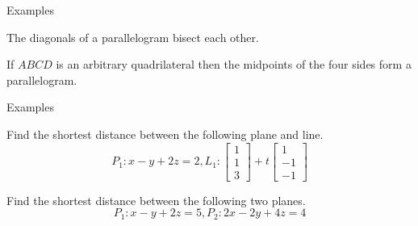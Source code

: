 \documentclass{beamer}
\begin{document}
\begin{frame}{Examples}
    \begin{example}
        The diagonals of a parallelogram bisect each other.
      \end{example}
      \begin{example}
        If $ABCD$ is an arbitrary quadrilateral then the midpoints of the four sides form a parallelogram.
      \end{example}
\end{frame}

\begin{frame}{Examples}
\begin{example}
Find the shortest distance between the following plane and line.
\begin{equation*}
P_1:x-y+2z=2, L_1:\left[
\begin{array}{c}
1\\
1\\
3
\end{array}
\right]+t \left[
\begin{array}{c}
1\\
-1\\
-1
\end{array}
\right]
\end{equation*}
\end{example}
\begin{example}
Find the shortest distance between the following two planes.
\begin{equation*}
P_1:x-y+2z=5, P_2:2x-2y+4z=4
\end{equation*}
\end{example}
\end{frame}
\end{document}
